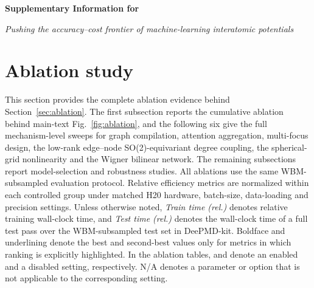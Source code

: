 
\renewcommand{\thefigure}{S-\arabic{figure}}
\setcounter{figure}{0}
\renewcommand{\thetable}{S-\arabic{table}}
\setcounter{table}{0}
\renewcommand{\thesection}{S-\arabic{section}}
\setcounter{section}{0}
\makeatletter
{}
{\newcommand{\theHfigure}{S-\arabic{figure}}}
{\renewcommand{\theHfigure}{S-\arabic{figure}}}
{\newcommand{\theHtable}{S-\arabic{table}}}
{\renewcommand{\theHtable}{S-\arabic{table}}}
{\newcommand{\theHsection}{S-\arabic{section}}}
{\renewcommand{\theHsection}{S-\arabic{section}}}
\makeatother

\FloatBarrier
\begin{center}
    {\LARGE\bfseries Supplementary Information for

        \textit{Pushing the accuracy--cost frontier of machine-learning
            interatomic potentials} \par}
    \vspace{1em}
\end{center}

\tableofcontents
\clearpage



\FloatBarrier
\section{Ablation study}
\label{sec:sm-ablation}

This section provides the complete ablation evidence behind Section~\ref{sec:ablation}.
The first subsection reports the cumulative ablation behind main-text Fig.~\ref{fig:ablation}, and the following six give the full mechanism-level sweeps for graph compilation, attention aggregation, multi-focus design, the low-rank edge--node SO(2)-equivariant degree coupling, the spherical-grid nonlinearity and the Wigner bilinear network.
The remaining subsections report model-selection and robustness studies.
All ablations use the same WBM-subsampled evaluation protocol.
Relative efficiency metrics are normalized within each controlled group under matched H20 hardware, batch-size, data-loading and precision settings.
Unless otherwise noted, \textit{Train time (rel.)
} denotes relative training wall-clock time, and
\textit{Test time (rel.)} denotes the wall-clock time of a full test pass over the
WBM-subsampled test set in DeePMD-kit.
Boldface and underlining denote the best and second-best values only for metrics in which ranking is explicitly highlighted.
In the ablation tables, \cmark{} and \xmark{} denote an enabled and a disabled setting, respectively.
N/A denotes a parameter or option that is not applicable to the corresponding setting.

